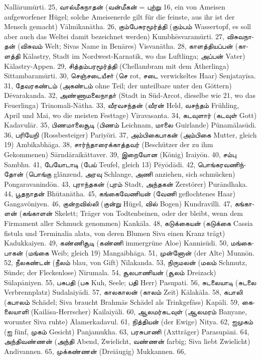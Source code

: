 \documentclass{article}
\newcommand{\TamilText}[1]{\texttamil{#1}}
\newcommand{\tam}[1]{\TamilText{#1}}
\begin{document}
Nall\={a}rum\={u}rti. 25, \tam{வால்மீகநாதன்} (\tam{வன்மீகன்} = \tam{புற்று} 16, ein von Ameisen aufgeworfener Hügel; solche Ameisenerde gilt für die feinste, aus ihr ist der Mensch gemacht) V\={a}lm\={i}kan\={a}tha. 26, \tam{கும்பேசுரமூர்த்தி} (\tam{கும்பம்} Wassertopf, es soll aber auch das Weltei damit bezeichnet werden) Kumbh\={e}svaram\={u}rti. 27, \tam{விசுவநாதன்} (\tam{விசுவம்} Welt; Sivas Name in Ben\={a}res) Visvan\={a}tha. 28, \tam{காளத்தியப்பன்} (\tam{காளத்தி} K\={a}lastry, Stadt im Nordwest-Karnatik, wo das Luftlinga; \tam{அப்பன்} Vater) K\={a}lastry-Appen. 29, \tam{சித்தம்பரமூர்த்தி} (Chellambram mit dem Ätherlinga) Sittambaram\={u}rti. 30, \tam{செஞ்சடையீசா்} (\tam{செ} rot, \tam{சடை} verwickeltes Haar) Senjatay\={i}sa. 31, \tam{தேவரகண்டம்} (\tam{அகண்டம்} ohne Teil; der unteilbare unter den Göttern) D\={e}varakanda. 32, \tam{அண்ணாமலைநாதா்} (Stadt in Süd-Arcot, dieselbe wie 21, wo das Feuerlinga) Trinomali-N\={a}tha. 33, \tam{வீரவசந்தன்} (\tam{வீரன்} Held, \tam{வசந்தம்} Frühling, April und Mai, wo die meisten Festtage) V\={i}ravasanta. 34, \tam{கடவுளார்} (\tam{கடவுள்} Gott) Kadavul\={a}r. 35, \tam{பிணமாலைசூடி} (\tam{பிணம்} Leichnam, \tam{மாலை} Guirlande) Pünam\={a}las\={u}di. 36, \tam{பரியேறி} (Rossbesteiger) Pariyöri. 37, \tam{அம்பிகைபாகன்} (\tam{அம்பிகை} Mutter, gleich 19) Ambikabh\={a}ga. 38, \tam{சார்ந்தாரைக்காத்தவர்} (Beschützer der zu ihm Gekommenen) S\={a}rnd\={a}raik\={a}ttaver. 39, \tam{இறையோன} (König) Iraiy\={o}n. 40, \tam{சம்பு} Sambhu. 41, \tam{பேயோடாடி} (\tam{பேய்} Teufel, gleich 13) P\={e}y\={o}d\={a}di. 42, \tam{பொங்கரவணிந்தோன்} (\tam{பொங்கு} glänzend, \tam{அரவு} Schlange, \tam{அணி} anziehen, sich schmücken) Pongaravanind\={o}n. 43, \tam{புராந்தகன்} (\tam{புரம்} Stadt, \tam{அந்தகன்} Zerstörer) Pur\={a}ndhaka. 44, \tam{பூதநாதன்} Bh\={u}tan\={a}tha. 45, \tam{கங்கைவேணியன்} (\tam{வேணி} geflochtenes Haar) Gangavöniyen. 46, \tam{குன்றவில்லி} (\tam{குன்று} Hügel, \tam{வில்} Bogen) Kundravilli. 47, \tam{கங்காளன்} (\tam{கங்காளன்} Skelett; Träger von Todtenbeinen, oder der bleibt, wenn dem Firmament aller Schmuck genommen) Kank\={a}la. 48, \tam{கடுக்கையன்} (\tam{கடுக்கை} Cassia fistula und Terminalia alata, von deren Blumen Siva einen Kranz trägt) Kadukkaiyen. 49, \tam{கண்ணிசூடி} (\tam{கண்ணி} immergrüne Aloe) Kannis\={u}di. 50, \tam{மங்கைபாகன்} (\tam{மங்கை} Weib; gleich 19) Mangaibh\={a}ga. 51, \tam{முன்னோன்} (der Alte) Munn\={o}n. 52, \tam{நீலகண்டன்} (\tam{நீலம்} blau, von Gift) N\={i}lakanda. 53, \tam{நிருமலன்} (\tam{மலம்} Schmutz, Sünde; der Fleckenlose) Nirumala. 54, \tam{சூலபாணியன்} (\tam{சூலம்} Dreizack) S\={u}lap\={a}niyen. 55, \tam{பசுபதி} (\tam{பசு} Kuh, Seele; \tam{பதி} Herr) Pasupati. 56, \tam{சுடலையாடி} (\tam{சுடலை} Verbrennplatz) Sudalaiy\={a}di. 57, \tam{காலகாலன்} (\tam{காலம்} Zeit) K\={a}lak\={a}la. 58, \tam{கபாலி} (\tam{கபாலம்} Schädel; Siva braucht Brahm\={a}s Schädel als Trinkgefäss) Kap\={a}li. 59, \tam{கைலையாளி} (Kail\={a}sa-Herrscher) Kailaiy\={a}li. 60, \tam{ஆலமர்கடவுள்} (\tam{ஆலமரம்} Banyane, worunter Siva ruhte) \={A}lamerkadavul. 61, \tam{நித்தியன்} (der Ewige) Nitya. 62, \tam{ஐமுகம்} (\tam{ஐ} fünf, \tam{முகம்} Gesicht) Panjamukha. 63, \tam{பரசுபாணி} (Axtträger) Parasup\={a}ni. 64, \tam{அந்திவண்ணன்} (\tam{அந்தி} Abend, Zwielicht, \tam{வண்ணன்} farbig; Siva liebt Zwielicht) Andivannen. 65, \tam{முக்கண்ணன்} (Dreiäugig) Mukkannen. 66, 
\end{document}
